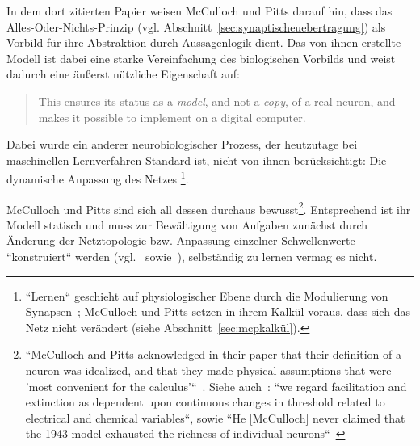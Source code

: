 In dem dort zitierten Papier weisen McCulloch und Pitts darauf hin, dass das Alles-Oder-Nichts-Prinzip ({vgl.} Abschnitt~\ref{sec:synaptischeuebertragung}) als Vorbild für ihre Abstraktion durch Aussagenlogik dient.
Das von ihnen erstellte Modell ist dabei eine starke Vereinfachung des biologischen Vorbilds und weist dadurch eine äußerst nützliche Eigenschaft auf:

\blockquote[{\cite[43; Hervorhebung i. O.]{BJ90}}]{
    This ensures its status as a \textit{model}, and not a \textit{copy}, of a real neuron, and makes it possible to implement on a digital computer.
}.

Dabei wurde ein anderer neurobiologischer Prozess, der heutzutage bei maschinellen Lernverfahren Standard ist, nicht von ihnen berücksichtigt: Die dynamische Anpassung des Netzes \footnote{
    ``Lernen`` geschieht auf physiologischer Ebene durch die Modulierung von Synapsen~\cite[115]{HS19c}; McCulloch und Pitts setzen in ihrem Kalkül voraus, dass sich das Netz nicht verändert (siehe Abschnitt~\ref{sec:mcpkalkül}).
}.

McCulloch und Pitts sind sich all dessen durchaus bewusst\footnote{
    ``McCulloch and Pitts acknowledged in their paper that their definition of a neuron was idealized, and that they made physical assumptions that were 'most convenient for the calculus'``~\cite[21]{Abr02}. Siehe auch~\cite[101]{MP43}: ``we regard facilitation and extinction as dependent upon continuous changes in threshold related to electrical and chemical variables``, sowie ``He {[McCulloch]} never claimed that the 1943 model exhausted the richness of individual neurons``~\cite[11]{Arb19}
}.
Entsprechend ist ihr Modell statisch und muss zur Bewältigung von Aufgaben zunächst durch Änderung der Netztopologie {bzw.} Anpassung einzelner Schwellenwerte ``konstruiert`` werden (vgl.~\cite[28]{Fau94} sowie~\cite[51]{Roj93}), selbständig zu lernen vermag es nicht.\\


